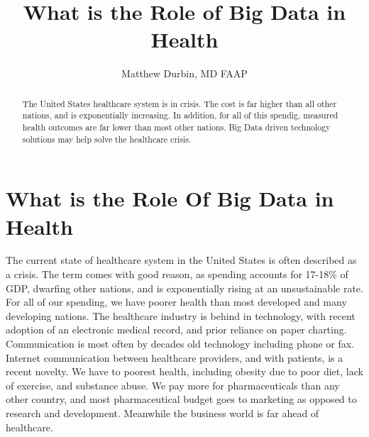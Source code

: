\documentclass[sigconf]{acmart}
\begin{document}
\title{What is the Role of Big Data in Health}


\author{Matthew Durbin, MD FAAP}

\renewcommand{\shortauthors}{M. Durbin}





\begin{abstract}
        The United States healthcare system is in crisis.  The cost is far
        higher than all other nations, and is exponentially increasing.  In addition,
        for all of this spendig, measured health outcomes are far lower than most
        other nations. Big Data driven technology solutions may help solve the healthcare
        crisis.
\end{abstract}

\maketitle

\section{What is the Role Of Big Data in Health}

The current state of healthcare system in the United States is often
described as a crisis.  The term comes with good reason, as spending
accounts for 17-18\% of GDP, dwarfing other nations, and is
exponentially rising at an unsustainable rate.  For all of our
spending, we have poorer health than most developed and many
developing nations.  The healthcare industry is behind in technology,
with recent adoption of an electronic medical record, and prior
reliance on paper charting.  Communication is most often by decades
old technology including phone or fax.  Internet communication between
healthcare providers, and with patients, is a recent novelty.  We have
to poorest health, including obesity due to poor diet, lack of
exercise, and substance abuse.  We pay more for pharmaceuticals than
any other country, and most pharmaceutical budget goes to marketing as
opposed to research and development.  Meanwhile the business world is
far ahead of healthcare.
\end{document}
